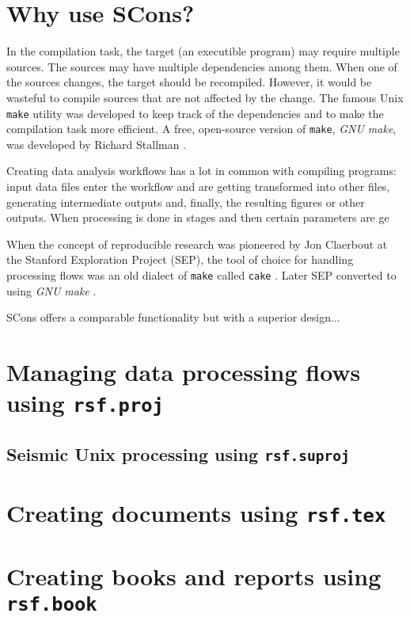\section{Why use SCons?}

In the compilation task, the target (an executible program) may
require multiple sources. The sources may have multiple dependencies
among them. When one of the sources changes, the target should be
recompiled. However, it would be wasteful to compile sources that are
not affected by the change. The famous Unix \texttt{make} utility was
developed to keep track of the dependencies and to make the
compilation task more efficient. A free, open-source version of
\texttt{make}, \emph{GNU make}, was developed by Richard Stallman
\cite[]{make}.

Creating data analysis workflows has a lot in common with compiling
programs: input data files enter the workflow and are getting
transformed into other files, generating intermediate outputs and,
finally, the resulting figures or other outputs. When processing is
done in stages and then certain parameters are ge

When the concept of reproducible research was pioneered by Jon
Claerbout at the Stanford Exploration Project (SEP), the tool of
choice for handling processing flows was an old dialect of
\texttt{make} called \texttt{cake}
\cite[]{Nichols.sep.61.341,Claerbout.sep.67.145,Claerbout.sep.73.451,Claerbout.sep.77.427}. Later
SEP converted to using \emph{GNU make} \cite{Schwab.sep.89.217}.

SCons offers a comparable functionality but with a superior design...

\section{Managing data processing flows using \texttt{rsf.proj}}

\subsection{Seismic Unix processing using  \texttt{rsf.suproj}}

\section{Creating documents using \texttt{rsf.tex}}

\section{Creating books and reports using \texttt{rsf.book}}



